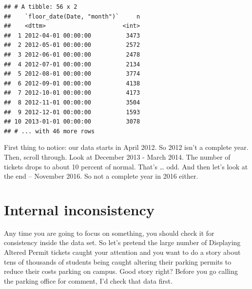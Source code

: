 \documentclass[]{book}
\newenvironment{Shaded}{\begin{snugshade}}{\end{snugshade}}
\newcommand{\KeywordTok}[1]{\textcolor[rgb]{0.13,0.29,0.53}{\textbf{#1}}}
\newcommand{\NormalTok}[1]{#1}
\newcommand{\OperatorTok}[1]{\textcolor[rgb]{0.81,0.36,0.00}{\textbf{#1}}}
\newcommand{\StringTok}[1]{\textcolor[rgb]{0.31,0.60,0.02}{#1}}
\begin{document}
\begin{Shaded}
\end{Shaded}

\begin{verbatim}
## # A tibble: 56 x 2
##    `floor_date(Date, "month")`     n
##    <dttm>                      <int>
##  1 2012-04-01 00:00:00          3473
##  2 2012-05-01 00:00:00          2572
##  3 2012-06-01 00:00:00          2478
##  4 2012-07-01 00:00:00          2134
##  5 2012-08-01 00:00:00          3774
##  6 2012-09-01 00:00:00          4138
##  7 2012-10-01 00:00:00          4173
##  8 2012-11-01 00:00:00          3504
##  9 2012-12-01 00:00:00          1593
## 10 2013-01-01 00:00:00          3078
## # ... with 46 more rows
\end{verbatim}

First thing to notice: our data starts in April 2012. So 2012 isn't a complete year. Then, scroll through. Look at December 2013 - March 2014. The number of tickets drops to about 10 percent of normal. That's \ldots{} odd. And then let's look at the end -- November 2016. So not a complete year in 2016 either.

\hypertarget{internal-inconsistency}{%
\section{Internal inconsistency}\label{internal-inconsistency}}

Any time you are going to focus on something, you should check it for consistency inside the data set. So let's pretend the large number of Displaying Altered Permit tickets caught your attention and you want to do a story about tens of thousands of students being caught altering their parking permits to reduce their costs parking on campus. Good story right? Before you go calling the parking office for comment, I'd check that data first.

\begin{Shaded}
\end{Shaded}
\end{document}
